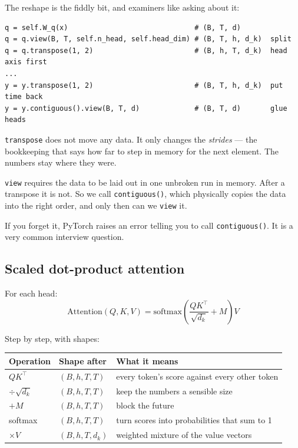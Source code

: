 \documentclass[11pt]{report}
\newcommand{\p}[1]{\texttt{#1}}
\begin{document}
The reshape is the fiddly bit, and examiners like asking about it:

\begin{lstlisting}
q = self.W_q(x)                              # (B, T, d)
q = q.view(B, T, self.n_head, self.head_dim) # (B, T, h, d_k)  split
q = q.transpose(1, 2)                        # (B, h, T, d_k)  head axis first
...
y = y.transpose(1, 2)                        # (B, T, h, d_k)  put time back
y = y.contiguous().view(B, T, d)             # (B, T, d)       glue heads
\end{lstlisting}

\begin{warnbox}
\p{transpose} does not move any data. It only changes the \emph{strides} --- the
bookkeeping that says how far to step in memory for the next element. The numbers
stay where they were.

\p{view} requires the data to be laid out in one unbroken run in memory. After a
transpose it is not. So we call \p{contiguous()}, which physically copies the
data into the right order, and only then can we \p{view} it.

If you forget it, PyTorch raises an error telling you to call \p{contiguous()}.
It is a very common interview question.
\end{warnbox}

\subsection{Scaled dot-product attention}

For each head:
\[
\text{Attention}(Q,K,V) = \text{softmax}\!\left(\frac{QK^\top}{\sqrt{d_k}} + M\right)V
\]

Step by step, with shapes:

\begin{center}
\begin{tabular}{llp{}}
\toprule
Operation & Shape after & What it means \\
\midrule
$QK^\top$ & $(B,h,T,T)$ & every token's score against every other token \\
$\div \sqrt{d_k}$ & $(B,h,T,T)$ & keep the numbers a sensible size \\
$+ M$ & $(B,h,T,T)$ & block the future \\
softmax & $(B,h,T,T)$ & turn scores into probabilities that sum to 1 \\
$\times V$ & $(B,h,T,d_k)$ & weighted mixture of the value vectors \\
\bottomrule
\end{tabular}
\end{center}
\end{document}

